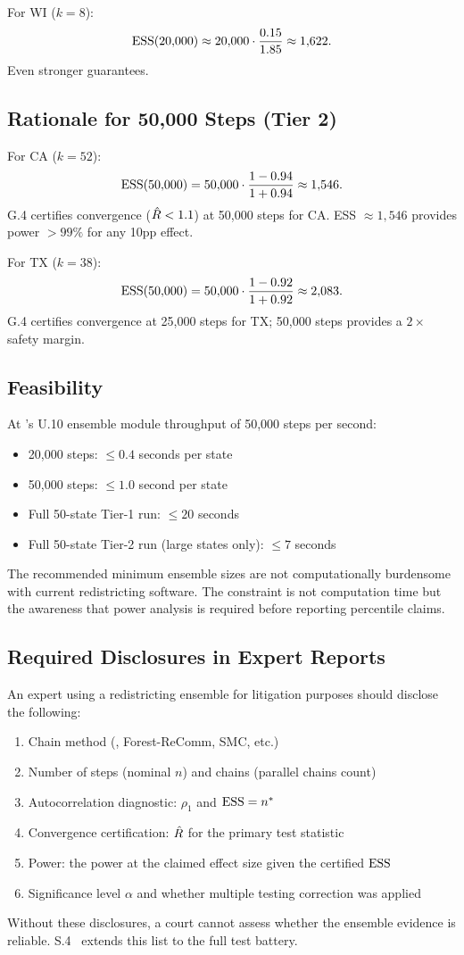 For WI ($k = 8$):
\[
  \mathrm{ESS}(20{,}000) \approx 20{,}000 \cdot \frac{0.15}{1.85} \approx 1{,}622.
\]
Even stronger guarantees.

\subsection{Rationale for 50,000 Steps (Tier 2)}

For CA ($k = 52$):
\[
  \mathrm{ESS}(50{,}000) = 50{,}000 \cdot \frac{1 - 0.94}{1 + 0.94} \approx 1{,}546.
\]
G.4 certifies convergence ($\hat{R} < 1.1$) at 50,000 steps for CA.
ESS $\approx 1{,}546$ provides power $>99\%$ for any 10pp effect.

For TX ($k = 38$):
\[
  \mathrm{ESS}(50{,}000) = 50{,}000 \cdot \frac{1 - 0.92}{1 + 0.92} \approx 2{,}083.
\]
G.4 certifies convergence at 25,000 steps for TX; 50,000 steps provides
a $2\times$ safety margin.

\subsection{Feasibility}

At \bisect{}'s U.10 ensemble module throughput of 50,000 steps per second:
\begin{itemize}
\item 20,000 steps: $\leq 0.4$ seconds per state
\item 50,000 steps: $\leq 1.0$ second per state
\item Full 50-state Tier-1 run: $\leq 20$ seconds
\item Full 50-state Tier-2 run (large states only): $\leq 7$ seconds
\end{itemize}

The recommended minimum ensemble sizes are not computationally burdensome
with current redistricting software.
The constraint is not computation time but the awareness that power
analysis is required before reporting percentile claims.

\subsection{Required Disclosures in Expert Reports}

An expert using a redistricting ensemble for litigation purposes should
disclose the following:
\begin{enumerate}
\item Chain method (\recom{}, Forest-ReComm, SMC, etc.)
\item Number of steps (nominal $n$) and chains (parallel chains count)
\item Autocorrelation diagnostic: $\rho_1$ and $\mathrm{ESS} = n^*$
\item Convergence certification: $\hat{R}$ for the primary test statistic
\item Power: the power at the claimed effect size given the certified $\mathrm{ESS}$
\item Significance level $\alpha$ and whether multiple testing correction was applied
\end{enumerate}

Without these disclosures, a court cannot assess whether the ensemble
evidence is reliable.
S.4~\citep{s4paper} extends this list to the full test battery.
